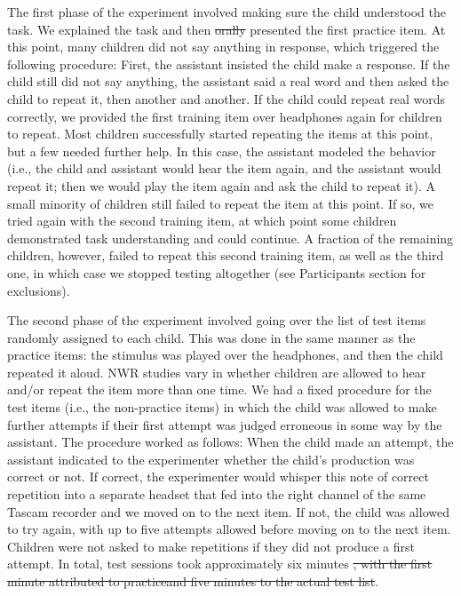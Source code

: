 \documentclass[ %
american, %
,man,floatsintext]{apa6} %
\providecommand{\DIFaddtex}[1]{{\protect\color{blue}\uwave{#1}}} %
\providecommand{\DIFdeltex}[1]{{\protect\color{red}\sout{#1}}}                      %
\providecommand{\DIFaddbegin}{} %
\providecommand{\DIFaddend}{} %
\providecommand{\DIFdelbegin}{} %
\providecommand{\DIFdelend}{} %
\providecommand{\DIFadd}[1]{\texorpdfstring{\DIFaddtex{#1}}{#1}} %
\providecommand{\DIFdel}[1]{\texorpdfstring{\DIFdeltex{#1}}{}} %
\newcommand{\DIFscaledelfig}{0.5}
\newlength{\DIFdelgraphicswidth} %
\newlength{\DIFdelgraphicsheight} %
\newcommand{\DIFaddincludegraphics}[2][]{{\color{blue}\fbox{\DIFOincludegraphics[#1]{#2}}}} %
\newcommand{\DIFdelincludegraphics}[2][]{%
	\sbox{\DIFdelgraphicsbox}{\DIFOincludegraphics[#1]{#2}}%
	\settoboxwidth{\DIFdelgraphicswidth}{\DIFdelgraphicsbox} %
	\settoboxtotalheight{\DIFdelgraphicsheight}{\DIFdelgraphicsbox} %
	\scalebox{\DIFscaledelfig}{%
		\parbox[b]{\DIFdelgraphicswidth}{\usebox{\DIFdelgraphicsbox}\\[-\baselineskip] \rule{\DIFdelgraphicswidth}{0em}}\llap{\resizebox{\DIFdelgraphicswidth}{\DIFdelgraphicsheight}{%
				\setlength{\unitlength}{\DIFdelgraphicswidth}%
				\begin{picture}(1,1)%
				\thicklines\linethickness{2pt} %
				{\color[rgb]{1,0,0}\put(0,0){\framebox(1,1){}}}%
				{\color[rgb]{1,0,0}\put(0,0){\line( 1,1){1}}}%
				{\color[rgb]{1,0,0}\put(0,1){\line(1,-1){1}}}%
				\end{picture}%
			}\hspace*{3pt}}} %
} %
\DeclareRobustCommand{\DIFaddbegin}{\DIFOaddbegin \let\includegraphics\DIFaddincludegraphics} %
\DeclareRobustCommand{\DIFaddend}{\DIFOaddend \let\includegraphics\DIFOincludegraphics} %
\DeclareRobustCommand{\DIFdelbegin}{\DIFOdelbegin \let\includegraphics\DIFdelincludegraphics} %
\DeclareRobustCommand{\DIFdelend}{\DIFOaddend \let\includegraphics\DIFOincludegraphics} %
\begin{document}
The first phase of the experiment involved making sure the child understood the task. We explained the task and then \DIFdelbegin \DIFdel{orally }\DIFdelend presented the first practice item. At this point, many children did not say anything in response, which triggered the following procedure: First, the assistant insisted the child make a response. If the child still did not say anything, the assistant said a real word and then asked the child to repeat it, then another and another. If the child could repeat real words correctly, we provided the first training item over headphones again for children to repeat. Most children successfully started repeating the items at this point, but a few needed further help. In this case, the assistant modeled the behavior (i.e., the child and assistant would hear the item again, and the assistant would repeat it; then we would play the item again and ask the child to repeat it). A small minority of children still failed to repeat the item at this point. If so, we tried again with the second training item, at which point some children demonstrated task understanding and could continue. A fraction of the remaining children, however, failed to repeat this second training item, as well as the third one, in which case we stopped testing altogether (see Participants section for exclusions).

The second phase of the experiment involved going over the list of test items randomly assigned to each child. This was done in the same manner as the practice items: the stimulus was played over the headphones, and then the child repeated it aloud. NWR studies vary in whether children are allowed to hear and/or repeat the item more than one time. We had a fixed procedure for the test items (i.e., the non-practice items) in which the child was allowed to make further attempts if their first attempt was judged erroneous in some way by the assistant. The procedure worked as follows: When the child made an attempt, the assistant indicated to the experimenter whether the child's production was correct or not. If correct, the experimenter would whisper this note of correct repetition into a separate headset that fed into the right channel of the same Tascam recorder and we moved on to the next item. If not, the child was allowed to try again, with up to five attempts allowed before moving on to the next item. Children were not asked to make repetitions if they did not produce a first attempt. In total, test sessions took approximately six minutes \DIFdelbegin \DIFdel{, with the first minute attributed to practiceand five minutes to the actual test list}\DIFdelend \DIFaddbegin \DIFadd{(one for practice; five for test list)}\DIFaddend .
\end{document}
